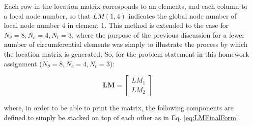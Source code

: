 \documentclass[10pt]{article}
\begin{document}
Each row in the location matrix corresponds to an elements, and each column to a local node number, so that \(LM(1,4)\) indicates the global node number of local node number 4 in element 1. This method is extended to the case for \(N_\theta=8, N_c=4, N_t=3\), where the purpose of the previous discussion for a fewer number of circumferential elements was simply to illustrate the process by which the location matrix is generated. So, for the problem statement in this homework assignment (\(N_\theta=8, N_c=4, N_t=3\)):

\begin{equation}
\label{eq:LMFinalForm}
\textbf{LM}=
\begin{bmatrix}LM_1 \\ LM_2\end{bmatrix}
\end{equation}

where, in order to be able to print the matrix, the following components are defined to simply be stacked on top of each other as in Eq. \eqref{eq:LMFinalForm}.
\end{document}
